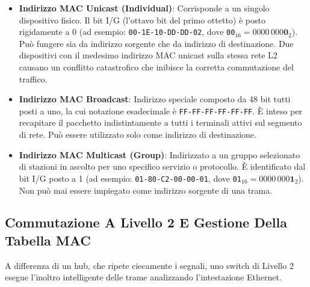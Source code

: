 \documentclass[11pt, a4paper]{article}
\begin{document}
\begin{itemize}
    \item \textbf{Indirizzo MAC Unicast (Individual)}: Corrisponde a un singolo dispositivo fisico. Il bit I/G (l'ottavo bit del primo ottetto) è posto rigidamente a 0 (ad esempio: \texttt{00-1E-10-DD-DD-02}, dove \texttt{00}$_{16} = 0000\,000\mathbf{0}_2$). Può fungere sia da indirizzo sorgente che da indirizzo di destinazione. Due dispositivi con il medesimo indirizzo MAC unicast sulla stessa rete L2 causano un conflitto catastrofico che inibisce la corretta commutazione del traffico.


    \item \textbf{Indirizzo MAC Broadcast}: Indirizzo speciale composto da 48 bit tutti posti a uno, la cui notazione esadecimale è \texttt{FF-FF-FF-FF-FF-FF}. È inteso per recapitare il pacchetto indistintamente a tutti i terminali attivi sul segmento di rete. Può essere utilizzato solo come indirizzo di destinazione.


    \item \textbf{Indirizzo MAC Multicast (Group)}: Indirizzato a un gruppo selezionato di stazioni in ascolto per uno specifico servizio o protocollo. È identificato dal bit I/G posto a 1 (ad esempio: \texttt{01-80-C2-00-00-01}, dove \texttt{01}$_{16} = 0000\,000\mathbf{1}_2$). Non può mai essere impiegato come indirizzo sorgente di una trama.
\end{itemize}

\subsection{Commutazione A Livello 2 E Gestione Della Tabella MAC}

A differenza di un hub, che ripete ciecamente i segnali, uno switch di Livello 2 esegue l'inoltro intelligente delle trame analizzando l'intestazione Ethernet.

\end{document}
